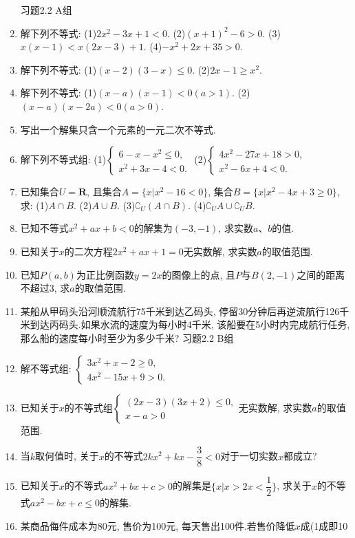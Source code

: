 \documentclass[10pt,a4paper]{article}
\begin{document}
\begin{enumerate}[1.]
习题2.2  A组
\item 解下列不等式:
(1)$2x^2-3x+1<0$.			(2)$(x+1)^2-6>0$.
(3)$x(x-1)<x(2x-3)+1$.	(4)$-x^2+2x+35>0$.
\item 解下列不等式:
(1)$(x-2)(3-x)\le 0$.				(2)$2x-1\ge x^2$.
\item 解下列不等式:
(1)$(x-a)(x-1)<0(a>1)$.		(2)$(x-a)(x-2a)<0(a>0)$.
\item 写出一个解集只含一个元素的一元二次不等式.
\item 解下列不等式组:
(1)$\begin{cases} 6-x-x^2\le 0, \\ x^2+3x-4<0. \end{cases}$			(2)$\begin{cases} 4x^2-27x+18>0, \\ x^2-6x+4<0. \end{cases}$
\item 已知集合$U=\mathbf{R}$, 且集合$A=\{x|x^2-16<0\}$, 集合$B=\{x|x^2-4x+3\ge 0\}$, 求:
(1)$A\cap B$.
(2)$A\cup B$.
(3)$\complement _U(A\cap B)$.
(4)$\complement _UA\cup \complement _UB$.
\item 已知不等式$x^2+ax+b<0$的解集为$(-3,-1)$, 求实数$a$、$b$的值.
\item 已知关于$x$的二次方程$2x^2+ax+1=0$无实数解, 求实数$a$的取值范围.
\item 已知$P(a,b)$为正比例函数$y=2x$的图像上的点, 且$P$与$B(2,-1)$之间的距离不超过3, 求$a$的取值范围.
\item 某船从甲码头沿河顺流航行75千米到达乙码头, 停留30分钟后再逆流航行126千米到达丙码头.如果水流的速度为每小时4千米, 该船要在5小时内完成航行任务, 那么船的速度每小时至少为多少千米?
习题2.2  B组
\item 解不等式组: $\begin{cases} 3x^2+x-2\ge 0, \\ 4x^2-15x+9>0. \end{cases}$
\item 已知关于$x$的不等式组$\begin{cases} (2x-3)(3x+2)\le 0, \\ x-a>0 \end{cases}$无实数解, 求实数$a$的取值范围.
\item 当$k$取何值时, 关于$x$的不等式$2kx^2+kx-\dfrac 38<0$对于一切实数$x$都成立?
\item 已知关于$x$的不等式$ax^2+bx+c>0$的解集是$\{x|x>2x<\dfrac 12\}$, 求关于$x$的不等式$ax^2-bx+c\le 0$的解集.
\item 某商品侮件成本为80元, 售价为100元, 每天售出100件.若售价降低$x$成(1成即10%

\end{enumerate}
\end{document}
